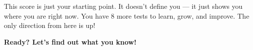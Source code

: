 {\begin{tcolorbox}[
    enhanced,
    colback=funYellowLight,
    colframe=funYellow!60,
    arc=10pt,
    boxrule=1pt,
    left=6mm, right=6mm, top=4mm, bottom=4mm,
]
\vspace{2mm}

This score is just your starting point. It doesn't define you — it just shows you where you are right now. You have 8 more tests to learn, grow, and improve. The only direction from here is up!
\end{tcolorbox}

\vspace{4mm}

\begin{center}
{\large\bfseries\color{funBlueDark} \faFlagCheckered\hspace{2mm}Ready? Let's find out what you know!\hspace{2mm}\faFlagCheckered}
\end{center}

}
\newpage
